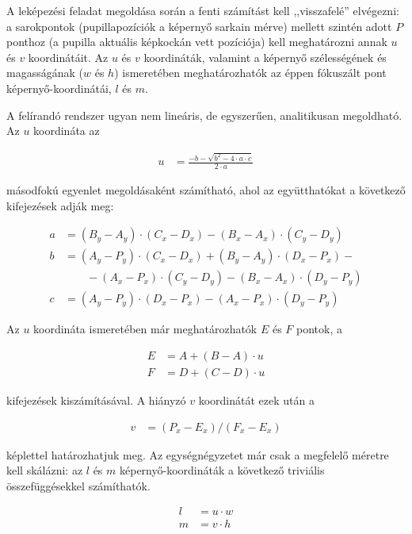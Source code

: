 A leképezési feladat megoldása során a fenti számítást kell ,,visszafelé'' elvégezni: a sarokpontok (pupillapozíciók a képernyő sarkain mérve) mellett szintén adott $P$ ponthoz (a pupilla aktuális képkockán vett pozíciója) kell meghatározni annak $u$ és $v$ koordinátáit. Az $u$ és $v$ koordináták, valamint a képernyő szélességének és magasságának ($w$ és $h$) ismeretében meghatározhatók az éppen fókuszált pont képernyő-koordinátái, $l$ és $m$.

A felírandó rendszer ugyan nem lineáris, de egyszerűen, analitikusan megoldható. Az $u$ koordináta az

\begin{align}\label{eq:calib_1}
u &= \frac{-b - \sqrt{b^2 - 4 \cdot a \cdot c}}{2 \cdot a}
\end{align}

másodfokú egyenlet megoldásaként számítható, ahol az együtthatókat a következő kifejezések adják meg:

\begin{align}\label{eq:calib_2}
a &= (B_y - A_y) \cdot (C_x - D_x) - (B_x - A_x) \cdot (C_y - D_y) \nonumber \\
b &= (A_y - P_y) \cdot (C_x - D_x) + (B_y - A_y) \cdot (D_x - P_x) - \nonumber \\ 
  & \qquad - (A_x - P_x) \cdot (C_y - D_y) - (B_x - A_x) \cdot (D_y - P_y) \nonumber \\
c &= (A_y - P_y) \cdot (D_x - P_x) - (A_x - P_x) \cdot (D_y - P_y)
\end{align}

Az $u$ koordináta ismeretében már meghatározhatók $E$ és $F$ pontok, a

\begin{align}\label{eq:calib_3}
E &= A + (B-A) \cdot u \nonumber \\
F &= D + (C-D) \cdot u
\end{align}

kifejezések kiszámításával. A hiányzó $v$ koordinátát ezek után a 

\begin{align}\label{eq:calib_4}
v &= (P_x - E_x) / (F_x - E_x)
\end{align}

képlettel határozhatjuk meg. Az egységnégyzetet már csak a megfelelő méretre kell skálázni: az $l$ és $m$ képernyő-koordináták a következő triviális összefüggésekkel számíthatók.

\begin{align}\label{eq:calib_5}
l &= u \cdot w \nonumber \\
m &= v \cdot h
\end{align}

